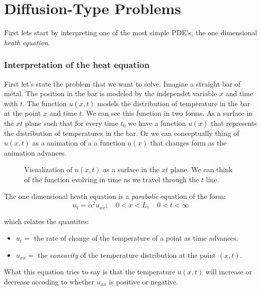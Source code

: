 \documentclass[../pde.tex]{subfiles}
\begin{document}
    \chapter{\sffamily Diffusion-Type Problems}
    First lets start by interpreting one of the most simple PDE's, the one dimensional \emph{heath equation}.
    \subsection{\sffamily Interpretation of the heat equation}
    First let's state the problem that we want to solve. Imagine a straight bar of metal. The position in the bar is modeled by
    the independet variable $x$ and time with $t$. The function $u(x,t)$ models the distribution of temperature in the bar at the
    point $x$ and time $t$. We can see this function in two forms. As a surface in the $xt$ plane such that for every time $t_0$ 
    we have a function $u(x)$ that represents the distribution of temperatures in the bar. Or we can conceptually thing of
    $u(x,t)$ as a animation of a a function $u(x)$ that changes form as the animation advances.

    \begin{figure}[ht]
        \centering
        \caption{Visualization of $u(x,t)$ as a surface in the $xt$ plane. We can think of the function evolving in time as we
        travel through the $t$ line.}
        \label{fig:xt-heath}
    \end{figure}

    The one dimensional heath equation is a \emph{parabolic} equation of the form:
    \begin{equation*}
        u_{t}=\alpha^2 u_{xx}; \quad 0<x<L,\quad  0<t<\infty 
    \end{equation*}
    
    which relates the quantites:
    \begin{itemize}
        \item $u_{t} = $ the rate of change of the temperature of a point as time advances.
        \item $u_{xx} = $ the \emph{concavity} of the temperature distribution at the point $(x,t)$. 
    \end{itemize}
    
    What this equation tries to say is that the temperature $u(x,t)$ will increase or decrease accoding to whether $u_{xx}$ 
    is positive or negative.
\end{document}
